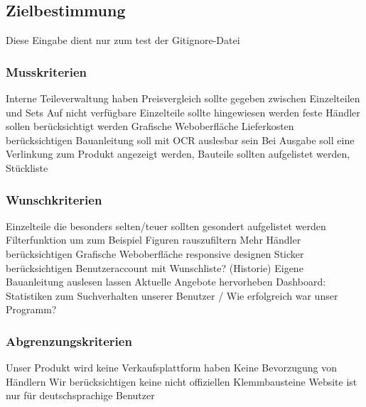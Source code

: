 \subsection{Zielbestimmung}

Diese Eingabe dient nur zum test der Gitignore-Datei

\subsubsection{Musskriterien}
Interne Teileverwaltung haben \newline
Preisvergleich sollte gegeben zwischen Einzelteilen und Sets \newline
Auf nicht verfügbare Einzelteile sollte hingewiesen werden  feste Händler sollen berücksichtigt werden \newline
Grafische Weboberfläche \newline
Lieferkosten berücksichtigen \newline
Bauanleitung soll mit OCR auslesbar sein \newline
Bei Ausgabe soll eine Verlinkung zum Produkt angezeigt werden, Bauteile sollten aufgelistet werden, Stückliste \newline

\subsubsection{Wunschkriterien}
Einzelteile die besonders selten/teuer sollten gesondert aufgelistet werden \newline
Filterfunktion um zum Beispiel Figuren rauszufiltern \newline
Mehr Händler berücksichtigen \newline
Grafische Weboberfläche responsive designen \newline
Sticker berücksichtigen \newline
Benutzeraccount mit Wunschliste? (Historie) \newline
Eigene Bauanleitung auslesen lassen \newline
Aktuelle Angebote hervorheben \newline
Dashboard: Statistiken zum Suchverhalten unserer Benutzer / Wie erfolgreich war unser Programm? \newline

\subsubsection{Abgrenzungskriterien}
Unser Produkt wird keine Verkaufsplattform haben  \newline
Keine Bevorzugung von Händlern \newline
Wir berücksichtigen keine nicht offiziellen Klemmbausteine \newline
Website ist nur für deutschsprachige Benutzer \newline

